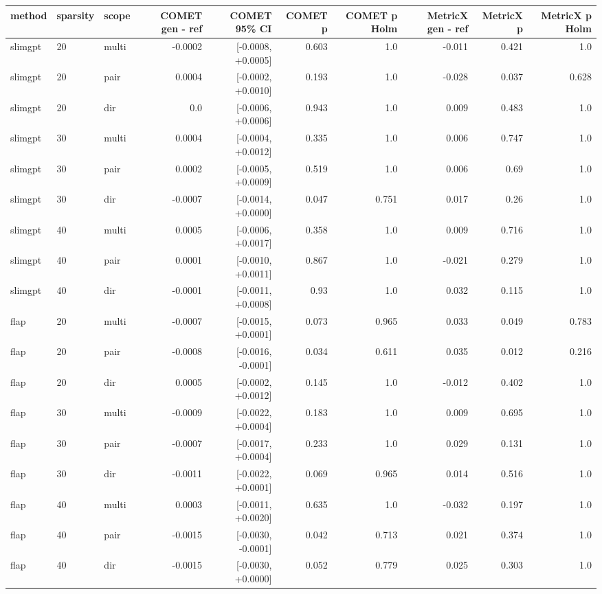 \begin{tabular}{lllrrrrrrr}
\toprule
method & sparsity & scope & COMET gen - ref & COMET 95\% CI & COMET p & COMET p Holm & MetricX gen - ref & MetricX p & MetricX p Holm \\
\midrule
slimgpt & 20 & multi & -0.0002 & [-0.0008, +0.0005] & 0.603 & 1.0 & -0.011 & 0.421 & 1.0 \\
slimgpt & 20 & pair & 0.0004 & [-0.0002, +0.0010] & 0.193 & 1.0 & -0.028 & 0.037 & 0.628 \\
slimgpt & 20 & dir & 0.0 & [-0.0006, +0.0006] & 0.943 & 1.0 & 0.009 & 0.483 & 1.0 \\
slimgpt & 30 & multi & 0.0004 & [-0.0004, +0.0012] & 0.335 & 1.0 & 0.006 & 0.747 & 1.0 \\
slimgpt & 30 & pair & 0.0002 & [-0.0005, +0.0009] & 0.519 & 1.0 & 0.006 & 0.69 & 1.0 \\
slimgpt & 30 & dir & -0.0007 & [-0.0014, +0.0000] & 0.047 & 0.751 & 0.017 & 0.26 & 1.0 \\
slimgpt & 40 & multi & 0.0005 & [-0.0006, +0.0017] & 0.358 & 1.0 & 0.009 & 0.716 & 1.0 \\
slimgpt & 40 & pair & 0.0001 & [-0.0010, +0.0011] & 0.867 & 1.0 & -0.021 & 0.279 & 1.0 \\
slimgpt & 40 & dir & -0.0001 & [-0.0011, +0.0008] & 0.93 & 1.0 & 0.032 & 0.115 & 1.0 \\
flap & 20 & multi & -0.0007 & [-0.0015, +0.0001] & 0.073 & 0.965 & 0.033 & 0.049 & 0.783 \\
flap & 20 & pair & -0.0008 & [-0.0016, -0.0001] & 0.034 & 0.611 & 0.035 & 0.012 & 0.216 \\
flap & 20 & dir & 0.0005 & [-0.0002, +0.0012] & 0.145 & 1.0 & -0.012 & 0.402 & 1.0 \\
flap & 30 & multi & -0.0009 & [-0.0022, +0.0004] & 0.183 & 1.0 & 0.009 & 0.695 & 1.0 \\
flap & 30 & pair & -0.0007 & [-0.0017, +0.0004] & 0.233 & 1.0 & 0.029 & 0.131 & 1.0 \\
flap & 30 & dir & -0.0011 & [-0.0022, +0.0001] & 0.069 & 0.965 & 0.014 & 0.516 & 1.0 \\
flap & 40 & multi & 0.0003 & [-0.0011, +0.0020] & 0.635 & 1.0 & -0.032 & 0.197 & 1.0 \\
flap & 40 & pair & -0.0015 & [-0.0030, -0.0001] & 0.042 & 0.713 & 0.021 & 0.374 & 1.0 \\
flap & 40 & dir & -0.0015 & [-0.0030, +0.0000] & 0.052 & 0.779 & 0.025 & 0.303 & 1.0 \\
\bottomrule
\end{tabular}
